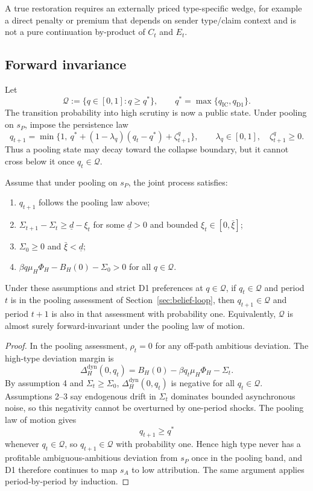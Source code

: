 A true restoration requires an externally priced type-specific wedge, for example a direct penalty or premium that depends on sender type/claim context and is not a pure continuation by-product of $C_t$ and $E_t$.

\subsection{Forward invariance}

Let
\[
\mathcal Q:=\{q\in[0,1]: q\ge q^*\},
\qquad q^*=\max\{q_{\mathrm{IC}},q_{\mathrm{D1}}\}.
\]
The transition probability into high scrutiny is now a public state. Under pooling on $s_P$, impose the persistence law
\[
q_{t+1}
=
\min\{1,\ q^*+(1-\lambda_q)(q_t-q^*)+\zeta_{t+1}^q\},
\qquad
\lambda_q\in[0,1],\quad \zeta_{t+1}^q\ge 0.
\]
Thus a pooling state may decay toward the collapse boundary, but it cannot cross below it once $q_t\in\mathcal Q$.

Assume that under pooling on $s_P$, the joint process satisfies:
\begin{enumerate}
\item $q_{t+1}$ follows the pooling law above;
\item $\Sigma_{t+1}-\Sigma_t\ge \underline d-\xi_t$ for some $\underline d>0$ and bounded $\xi_t\in[0,\bar\xi]$;
\item $\Sigma_0\ge 0$ and $\bar\xi<\underline d$;
\item $\beta q\mu_H\Phi_H-B_H(0)-\Sigma_0>0$ for all $q\in\mathcal Q$.
\end{enumerate}

\begin{theorem}
\label{thm:forward-invariance}
Under these assumptions and strict D1 preferences at $q\in\mathcal Q$, if $q_t\in\mathcal Q$ and period $t$ is in the pooling assessment of Section~\ref{sec:belief-loop}, then $q_{t+1}\in\mathcal Q$ and period $t+1$ is also in that assessment with probability one. Equivalently, $\mathcal Q$ is almost surely forward-invariant under the pooling law of motion.
\end{theorem}

\begin{proof}
In the pooling assessment, $\rho_t=0$ for any off-path ambitious deviation. The high-type deviation margin is
\[
\Delta_H^{\mathrm{dyn}}(0,q_t)=B_H(0)-\beta q_t\mu_H\Phi_H-\Sigma_t.
\]
By assumption 4 and $\Sigma_t\ge \Sigma_0$, $\Delta_H^{\mathrm{dyn}}(0,q_t)$ is negative for all $q_t\in\mathcal Q$. Assumptions 2--3 say endogenous drift in $\Sigma_t$ dominates bounded asynchronous noise, so this negativity cannot be overturned by one-period shocks.
The pooling law of motion gives
\[
q_{t+1}
\ge
q^*
\]
whenever $q_t\in\mathcal Q$, so $q_{t+1}\in\mathcal Q$ with probability one. Hence high type never has a profitable ambiguous-ambitious deviation from $s_P$ once in the pooling band, and D1 therefore continues to map $s_A$ to low attribution. The same argument applies period-by-period by induction.
\end{proof}

